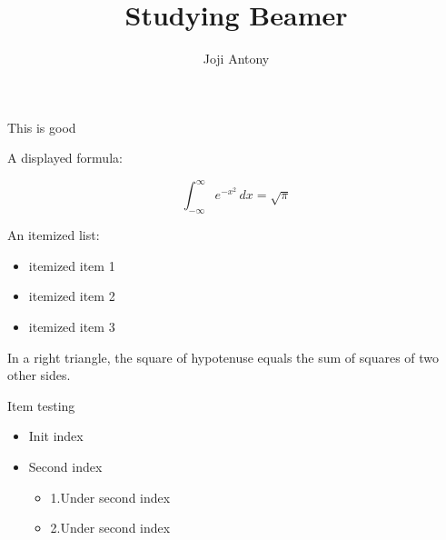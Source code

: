 \documentclass{beamer}
\author{Joji Antony}
\title{Studying Beamer}
\institute{CET}
\begin{document}
\begin{frame}{This is good}

A displayed formula:

\[
  \int_{-\infty}^\infty e^{-x^2} \, dx = \sqrt{\pi}
\]

An itemized list:

\begin{itemize}
  \item itemized item 1
  \item itemized item 2
  \item itemized item 3
\end{itemize}

\begin{theorem}
  In a right triangle, the square of hypotenuse equals
  the sum of squares of two other sides.
\end{theorem}

\end{frame}
\begin{frame}{Item testing}
\begin{itemize}
\item Init index
\item Second index
\begin{itemize}
\pause
\item 1.Under second index
\item 2.Under second index
\end{itemize}
\end{itemize}




\end{frame}
\end{document}
